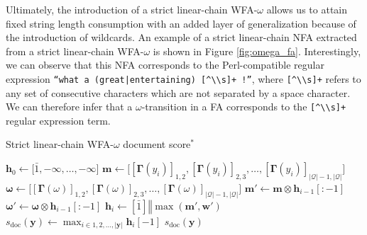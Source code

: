 Ultimately, the introduction of a strict linear-chain WFA-$\omega$ allows us to
attain fixed string length consumption with an added layer of generalization
because of the introduction of wildcards. An example of a strict linear-chain
NFA extracted from a strict linear-chain WFA-$\omega$ is shown in Figure
\ref{fig:omega_fa}. Interestingly, we can observe that this NFA corresponds to
the Perl-compatible regular expression \texttt{``what a (great|entertaining)
  [\^{}\textbackslash\textbackslash s]+ !''}, where
\texttt{[\^{}\textbackslash\textbackslash s]+} refers to any set of consecutive
characters which are not separated by a space character. We can therefore infer
that a $\omega$-transition in a FA corresponds to the
\texttt{[\^{}\textbackslash\textbackslash s]+} regular expression term.

\begin{algorithm}[t!]
  \small
  \caption{Strict linear-chain WFA-$\omega$ document score$^*$}
  \label{algo:lc_wfa_w_document_score}
  \begin{algorithmic}[1]
    \Statex
    \State $\bm{h}_0 \gets \big[\bar{1}, -\infty, \ldots, -\infty\big]$ 
     
    \State $\bm{m} \gets \big[[\bm{\Gamma}(y_i)]_{1,2}, [\bm{\Gamma}(y_i)]_{2,3}, \ldots,
    [\bm{\Gamma}(y_i)]_{|\mathcal{Q}|-1,|\mathcal{Q}|}\big]$ 
    \State $\bm{\omega} \gets \big[[\bm{\Gamma}(\omega)]_{1,2}, [\bm{\Gamma}(\omega)]_{2,3}, \ldots,
    [\bm{\Gamma}(\omega)]_{|\mathcal{Q}|-1,|\mathcal{Q}|}\big]$
    \State $\bm{m'} \gets \bm{m} \otimes \bm{h}_{i-1}[:-1]$ 
    \State $\bm{\omega'} \gets \bm{\omega} \otimes \bm{h}_{i-1}[:-1]$ 
    \State $\bm{h}_{i} \gets [\bar{1}] \mathbin\Vert \max(\bm{m'}, \bm{w'})$
    \EndFor
    \State $s_{\text{doc}}(\bm{y}) \gets  \max_{i \in 1,2,...,|\bm{y}|}
    \bm{h}_{i}[-1]$
    \State \Return $s_{\text{doc}}(\bm{y})$
    \EndFunction
  \end{algorithmic}
\end{algorithm}

